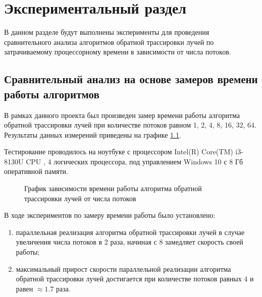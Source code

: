 \chapter{Экспериментальный раздел}
\label{cha:research}
    В данном разделе будут выполнены эксперименты для проведения 
    сравнительного анализа алгоритмов обратной трассировки лучей по затрачиваемому процессорному 
    времени в зависимости от числа потоков.

    \section{Сравнительный анализ на основе замеров времени работы алгоритмов}
	 В рамках данного проекта был произведен замер времени работы алгоритма обратной трассировки лучей при количестве потоков равном 1, 2, 4, 8, 16, 32, 64.
	Результаты данных измерений приведены на графике \ref{graph:1}.

        Тестирование проводилось на ноутбуке с процессором
        Intel(R) Core(TM) i3-8130U CPU \cite{processor-i3-8130u}, 4 логических процессора,
        под управлением Windows 10 с 8 Гб оперативной памяти.

    \begin{figure}[h!]
        \centering
        \caption{График зависимости времени работы алгоритма обратной трассировки лучей от числа потоков} 
        \label{graph:1}
    \end{figure}

        В ходе экспериментов по замеру времени работы было установлено:
	\begin{enumerate}
	\item параллельная реализация алгоритма обратной трассировки лучей в случае увеличения числа потоков в 2 раза, начиная с 8 замедляет скорость своей работы;
	\item максимальный прирост скорости параллельной реализации алгоритма обратной трассировки лучей достигается при количестве потоков равных 4 и равен  $ \approx 1.7 $ раза.

        \end{enumerate}



   
\newpage